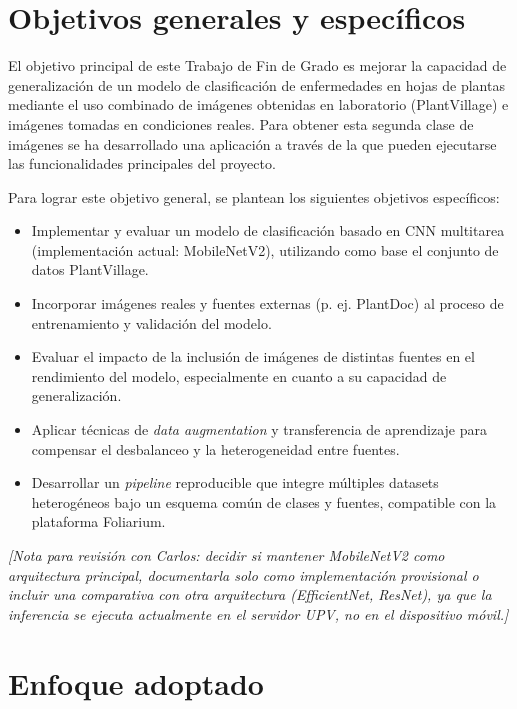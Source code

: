 \documentclass[11pt,spanish,listoffigures,listoftables]{tfgetsinf}
\begin{document}
\section{Objetivos generales y específicos}

El objetivo principal de este Trabajo de Fin de Grado es mejorar la capacidad de generalización de un modelo de clasificación de enfermedades en hojas de plantas mediante el uso combinado de imágenes obtenidas en laboratorio (PlantVillage) e imágenes tomadas en condiciones reales. Para obtener esta segunda clase de imágenes se ha desarrollado una aplicación a través de la que pueden ejecutarse las funcionalidades principales del proyecto.

Para lograr este objetivo general, se plantean los siguientes objetivos específicos:

\begin{itemize}
    \item Implementar y evaluar un modelo de clasificación basado en CNN multitarea (implementación actual: MobileNetV2), utilizando como base el conjunto de datos PlantVillage.
    \item Incorporar imágenes reales y fuentes externas (p. ej. PlantDoc) al proceso de entrenamiento y validación del modelo.
    \item Evaluar el impacto de la inclusión de imágenes de distintas fuentes en el rendimiento del modelo, especialmente en cuanto a su capacidad de generalización.
    \item Aplicar técnicas de \textit{data augmentation} y transferencia de aprendizaje para compensar el desbalanceo y la heterogeneidad entre fuentes.
    \item Desarrollar un \textit{pipeline} reproducible que integre múltiples datasets heterogéneos bajo un esquema común de clases y fuentes, compatible con la plataforma Foliarium.
\end{itemize}

\textit{[Nota para revisión con Carlos: decidir si mantener MobileNetV2 como arquitectura principal, documentarla solo como implementación provisional o incluir una comparativa con otra arquitectura (EfficientNet, ResNet), ya que la inferencia se ejecuta actualmente en el servidor UPV, no en el dispositivo móvil.]}

\section*{Enfoque adoptado}
\end{document}
